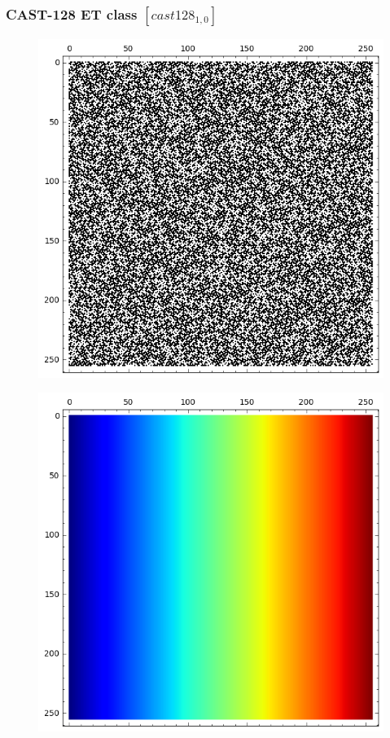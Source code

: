 \documentclass[pdf,sprung,slideColor,nocolorBG]{beamer}
\newenvironment{colortheme}[1]{
\def\ProvidesPackageRCS $##1${\relax}
\renewcommand{\ProcessOptions}{\relax}
\makeatletter

\makeatother
}{}
\begin{document}
\begin{colortheme}{jubata}

\begin{frame}
\frametitle{CAST-128 ET class $[cast128_{1,0}]$}
\begin{figure}
\centering
\begin{minipage}{.48\textwidth}
  \centering
\includegraphics[width=.9\linewidth]{../matrix_plot/cast128_1_0_weight_class_matrix.png}
  \label{fig:cast128_1_0_weight_class_matrix}
\end{minipage}
\begin{minipage}{.48\textwidth}
  \centering
\includegraphics[width=.9\linewidth]{../matrix_plot/cast128_1_0_bent_cayley_graph_index_matrix.png}

\end{minipage}
\end{figure}
\end{frame}
\end{colortheme}
\end{document}
